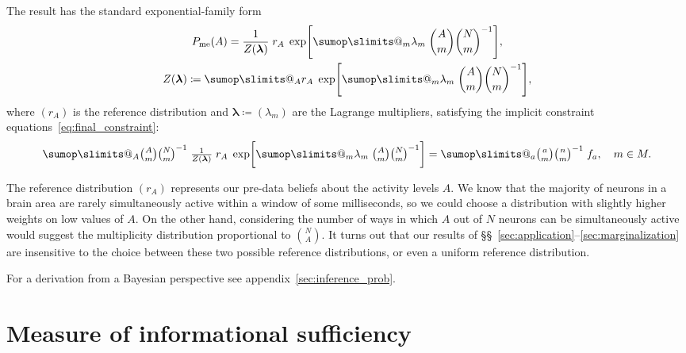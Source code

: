 \documentclass[\ifafour a4paper,12pt,\else a5paper,10pt,\fi%
onecolumn,oneside,article,%
british%
]{memoir}
\makeatletter
\theoremstyle{remark}
\theoremstyle{innote}
\def\sum{\DOTSI\sumop\slimits@}
\newcommand*{\defd}{\coloneqq}
\renewcommand*{\|}{\nonscript\,\vert\nonscript\;\mathopen{}}
\newcommand*{\sects}{\S\S}%
\newcommand*{\yAv}{A}
\newcommand*{\yav}{a}
\newcommand*{\yff}{f}
\newcommand*{\ya}{\yav}%
\newcommand*{\yA}{\yAv}%
\newcommand*{\yll}{\bm{\lambda}}
\newcommand*{\yl}{\lambda}
\newcommand*{\px}{P_{\text{me}}}
\makeatother
\begin{document}
The result has the standard exponential-family form
\begin{equation}
  \label{eq:app_maxent_pop}
  \begin{gathered}
  \px(\yA)  = \frac{1}{Z(\yll)}\;
  r_{\yA}\;
  \exp\Biggl[\sum_{m}\yl_{m}\;
  \binom{\yA}{m}\binom{N}{m}^{-1}
  \Biggr],
  \\
  Z(\yll)\defd \sum_{\yA} r_{\yA}\;
  \exp\Biggl[\sum_{m}\yl_{m}\;
  \binom{\yA}{m}\binom{N}{m}^{-1}
  \Biggr],
\end{gathered}
\end{equation}
where $(r_{\yA})$ is the reference distribution and $\yll\defd (\yl_{m})$ are
the Lagrange multipliers, satisfying the implicit
constraint equations~\eqref{eq:final_constraint}:
\begin{equation}
  \label{eq:constraint_eq_lambda}
  \sum_{\yA}
  \tbinom{\yA}{m}\tbinom{N}{m}^{-1}\;
  \tfrac{1}{Z(\yll)}\;
  r_{\yA}\;
  \exp\biggl[\sum_{m}\yl_{m}\;
  \tbinom{\yA}{m}\tbinom{N}{m}^{-1}
  \biggr]
=
  \sum_{\ya}
  \tbinom{\ya}{m} \tbinom{n}{m}^{-1} \; \yff_{\ya},\quad
  m\in M.
\end{equation}

The reference distribution $(r_{\yA})$ represents our pre-data beliefs
about the activity levels $\yA$. We know that the majority of neurons in a
brain area are rarely simultaneously active within a window of some
milliseconds, so we could choose a distribution with slightly higher
weights on low values of $\yA$. On the other hand, considering the number
of ways in which $\yA$ out of $N$ neurons can be simultaneously active
would suggest the multiplicity distribution proportional to
$\binom{N}{\yA}$. It turns out that our results of
\sects~\ref{sec:application}--\ref{sec:marginalization} are insensitive to
the choice between these two possible reference distributions, or even a
uniform reference distribution.

For a derivation from a Bayesian perspective see
appendix~\ref{sec:inference_prob}.


\section{Measure of informational sufficiency}
\label{sec:measure_suff}
\end{document}
